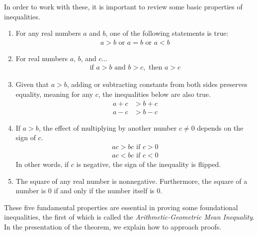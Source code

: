 In order to work with these, it is important to review some basic properties of inequalities.

\begin{enumerate}
	\item For any real numbers $a$ and $b$, one of the following statements is true:
		\begin{align*}
			a > b \text{ or } a = b \text{ or } a < b
		\end{align*}
	\item For real numbers $a$, $b$, and $c$...
		\begin{align*}
			\text{if } a > b \text{ and } b > c, \text{ then } a > c 
		\end{align*}
	\item Given that $a > b$, adding or subtracting constants from both sides preserves equality, meaning for any $c$, the inequalities below are also true.
		\begin{align*}
			a + c &> b + c \\
			a - c &> b - c
		\end{align*}
	\item If $a > b$, the effect of multiplying by another number $c \neq 0$ depends on the sign of $c$.
		\begin{align*}
			ac > bc \text{ if } c > 0 \\
			ac < bc \text{ if } c < 0
		\end{align*}
		In other words, if $c$ is negative, the sign of the inequality is flipped.
	\item The square of any real number is nonnegative. Furthermore, the square of a number is 0 if and only if the number itself is 0.
\end{enumerate}

These five fundamental properties are essential in proving some foundational inequalities, the first of which is called the \emph{Arithmetic-Geometric Mean Inequality}. In the presentation of the theorem, we explain how to approach proofs. \\

